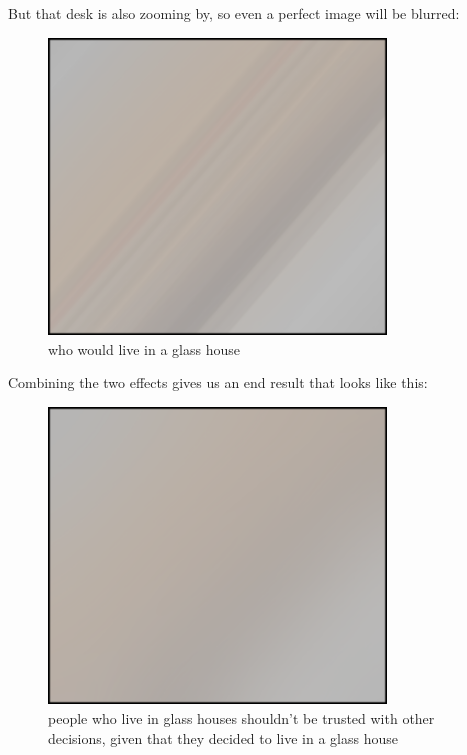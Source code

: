 {But that desk is also zooming by, so even a perfect image will be blurred:}

\begin{figure}[!htbp]
\centering
\includegraphics[scale=0.5, max width=0.8\textwidth]{imgs/a/32/hubble_motion_1.png}
\caption{who would live in a glass house}
\end{figure}

{Combining the two effects gives us an end result that looks like this:}

\begin{figure}[!htbp]
\centering
\includegraphics[scale=0.5, max width=0.8\textwidth]{imgs/a/32/hubble_motion_2.png}
\caption{people who live in glass houses shouldn't be trusted with other decisions, given that they decided to live in a glass house}
\end{figure}


